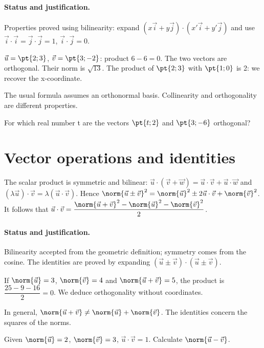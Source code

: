 \paragraph{Status and justification.} Properties proved using bilinearity: expand $(x\vec i+y\vec j)\cdot(x\prime\vec i+y\prime\vec j)$ and use $\vec i\cdot\vec i=\vec j\cdot\vec j=1$, $\vec i\cdot\vec j=0$.
\begin{example}$\vec u=\pt{2;3}$, $\vec v=\pt{3;-2}$: product $6-6=0$. The two vectors are orthogonal. Their norm is $\sqrt{13}$. The product of $\pt{2;3}$ with $\pt{1;0}$ is 2: we recover the x-coordinate.\end{example}\label{C03-EX2}
\begin{pitfall}The usual formula assumes an orthonormal basis. Collinearity and orthogonality are different properties.\end{pitfall}
\begin{application}For which real number t are the vectors $\pt{t;2}$ and $\pt{3;-6}$ orthogonal?\end{application}\label{C03-AP2}
\section{Vector operations and identities}\label{C03-U3}
\begin{keypoint}
The scalar product is symmetric and bilinear: $\vec u\cdot(\vec v+\vec w)=\vec u\cdot\vec v+\vec u\cdot\vec w$ and $(\lambda\vec u)\cdot\vec v=\lambda(\vec u\cdot\vec v)$. Hence $\norm{\vec u\pm\vec v}^2=\norm{\vec u}^2\pm2\vec u\cdot\vec v+\norm{\vec v}^2$. It follows that $\vec u\cdot \vec v=\dfrac{\norm{\vec u+\vec v}^2-\norm{\vec u}^2-\norm{\vec v}^2}{2}$.
\end{keypoint}
\paragraph{Status and justification.} Bilinearity accepted from the geometric definition; symmetry comes from the cosine. The identities are proved by expanding $(\vec u\pm\vec v)\cdot(\vec u\pm\vec v)$.
\begin{example}If $\norm{\vec u}=3$, $\norm{\vec v}=4$ and $\norm{\vec u+\vec v}=5$, the product is $\dfrac{25-9-16}{2}=0$. We deduce orthogonality without coordinates.\end{example}\label{C03-EX3}
\begin{pitfall}In general, $\norm{\vec u+\vec v}\ne\norm{\vec u}+\norm{\vec v}$. The identities concern the squares of the norms.\end{pitfall}
\begin{application}Given $\norm{\vec u}=2$, $\norm{\vec v}=3$, $\vec u\cdot\vec v=1$. Calculate $\norm{\vec u-\vec v}$.\end{application}\label{C03-AP3}
